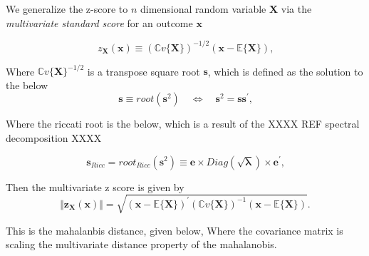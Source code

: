 \documentclass[../main.tex]{subfiles}
\begin{document}
\vspace{1cm}

We generalize the z-score to $n$ dimensional random variable $\mathbf{X}$ via 
the \textit{multivariate standard score} for an outcome $\mathbf{x}$

\begin{equation}
    z_{\boldsymbol{X}}\left( \boldsymbol{x}\right) \equiv(\mathbb{C}v\{\boldsymbol{X}\})^{-1/2}(\boldsymbol{x}-\mathbb{E}\{\boldsymbol{X}\})\text{,}
    \end{equation}

Where  $\mathbb{C}v\{\boldsymbol{X}\}^{-1/2}$  is a transpose square root $\mathbf{s}$, which is defined as the solution to the below
\begin{equation}
    \boldsymbol{s}\equiv\mathit{root}(\boldsymbol{s}^{2})\quad\Leftrightarrow \quad\boldsymbol{s}^{2}=\boldsymbol{s}\boldsymbol{s}^{\prime}\text{,}
    \end{equation}

Where the riccati root is the below, which is a result of the
XXXX REF spectral decomposition XXXX

\begin{equation}
    \boldsymbol{s}_{\mathit{Ricc}}=\mathit{root}_{\mathit{Ricc}}(\boldsymbol{s}^{2})\equiv\boldsymbol{e}\times\mathit{Diag}(\sqrt{\boldsymbol{\lambda}})\times\boldsymbol{e}^{\prime}\text{,}
    \end{equation}

Then the multivariate z score is given by 
\begin{equation}
    \Vert\boldsymbol{z}_{\boldsymbol{X}}(\boldsymbol{x})\Vert=\sqrt{(\boldsymbol{x}-\mathbb{E}\{\boldsymbol{X}\})^{\prime}(\mathbb{C}v\{\boldsymbol{X}\})^{-1}(\boldsymbol{x}-\mathbb{E}\{\boldsymbol{X}\})}\text{.}
    \end{equation}

This is the mahalanbis distance, given below, Where
the covariance matrix is scaling 
the multivariate distance property
of the mahalanobis.
\end{document}
